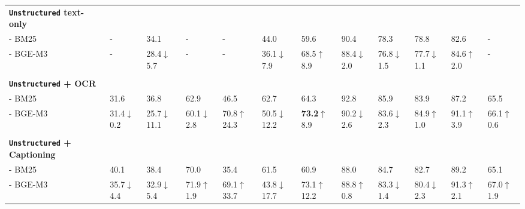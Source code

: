 \documentclass{article} %
\newcommand{\code}[1]{\texttt{#1}}
\begin{document}
\begin{table}[ht]
{\begin{tabular}{ll@{\hskip 0.5em}l@{\hskip 0.5em}l@{\hskip 0.5em}l@{\hskip 0.5em}l@{\hskip 0.5em}l@{\hskip 0.5em}l@{\hskip 0.5em}l@{\hskip 0.5em}l@{\hskip 0.5em}l|@{\hskip 0.5em}l}
\midrule
    \multicolumn{0}{l}{\textbf{\code{Unstructured} \tiny text-only}}&&&&&&&&&&&\\
- BM25 & - & 34.1 & - & - & 44.0 & 59.6 & 90.4 & 78.3 & 78.8 & 82.6 &-\\
- BGE-M3 & - & 28.4\textcolor{red!75!black}{\tiny $\downarrow$5.7} & - & - & 36.1\textcolor{red!75!black}{\tiny $\downarrow$7.9} & 68.5\textcolor{green!75!black}{\tiny $\uparrow$8.9} & 88.4\textcolor{red!75!black}{\tiny $\downarrow$2.0} & 76.8\textcolor{red!75!black}{\tiny $\downarrow$1.5} & 77.7\textcolor{red!75!black}{\tiny $\downarrow$1.1} & 84.6\textcolor{green!75!black}{\tiny $\uparrow$2.0} & -\\
\\
\multicolumn{0}{l}{\textbf{\code{Unstructured} \tiny+ OCR}}&&&&&&&&&&&\\
- BM25 & 31.6 & 36.8 & 62.9 & 46.5 & 62.7 & 64.3 & 92.8 & 85.9 & 83.9 & 87.2 & 65.5\\
- BGE-M3 & 31.4\textcolor{red!75!black}{\tiny $\downarrow$0.2} & 25.7\textcolor{red!75!black}{\tiny $\downarrow$11.1} & 60.1\textcolor{red!75!black}{\tiny $\downarrow$2.8} & 70.8\textcolor{green!75!black}{\tiny $\uparrow$24.3} & 50.5\textcolor{red!75!black}{\tiny $\downarrow$12.2} & \textbf{73.2}\textcolor{green!75!black}{\tiny $\uparrow$8.9} & 90.2\textcolor{red!75!black}{\tiny $\downarrow$2.6} & 83.6\textcolor{red!75!black}{\tiny $\downarrow$2.3} & 84.9\textcolor{green!75!black}{\tiny $\uparrow$1.0} & 91.1\textcolor{green!75!black}{\tiny $\uparrow$3.9} & 66.1\textcolor{green!75!black}{\tiny $\uparrow$0.6}\\
\\
\multicolumn{0}{l}{\textbf{\code{Unstructured} \tiny+ Captioning}}&&&&&&&&&&&\\
- BM25 & 40.1 & 38.4 & 70.0 & 35.4 & 61.5 & 60.9 & 88.0 & 84.7 & 82.7 & 89.2 
& 65.1\\
- BGE-M3 & 35.7\textcolor{red!75!black}{\tiny $\downarrow$4.4} & 32.9\textcolor{red!75!black}{\tiny $\downarrow$5.4} & 71.9\textcolor{green!75!black}{\tiny $\uparrow$1.9} & 69.1\textcolor{green!75!black}{\tiny $\uparrow$33.7} & 43.8\textcolor{red!75!black}{\tiny $\downarrow$17.7} & 73.1\textcolor{green!75!black}{\tiny $\uparrow$12.2} & 88.8\textcolor{green!75!black}{\tiny $\uparrow$0.8} & 83.3\textcolor{red!75!black}{\tiny $\downarrow$1.4} & 80.4\textcolor{red!75!black}{\tiny $\downarrow$2.3} & 91.3\textcolor{green!75!black}{\tiny $\uparrow$2.1} & 67.0\textcolor{green!75!black}{\tiny $\uparrow$1.9}\\
    \midrule

\end{tabular}}
\end{table}
\end{document}
